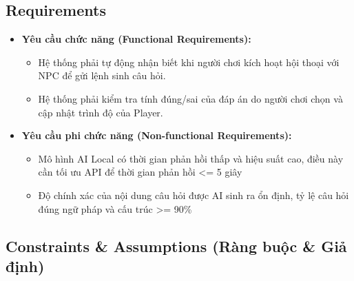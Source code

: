 \subsection{Requirements}
\begin{itemize}
	\item \textbf{Yêu cầu chức năng (Functional Requirements):} 
	\begin{itemize}
		\item Hệ thống phải tự động nhận biết khi người chơi kích hoạt hội thoại với NPC để gửi lệnh sinh câu hỏi.
		\item Hệ thống phải kiểm tra tính đúng/sai của đáp án do người chơi chọn và cập nhật trình độ của Player.
	\end{itemize}	 
	\item \textbf{Yêu cầu phi chức năng (Non-functional Requirements):}
	\begin{itemize}
		\item Mô hình AI Local có thời gian phản hồi thấp và hiệu suất cao, điều này cần tối ưu API để thời gian phản hồi <= 5 giây
		\item Độ chính xác của nội dung câu hỏi được AI sinh ra ổn định, tỷ lệ câu hỏi đúng ngữ pháp và cấu trúc >= 90\%
	\end{itemize}
\end{itemize}

\subsection{Constraints \& Assumptions (Ràng buộc \& Giả định)}

